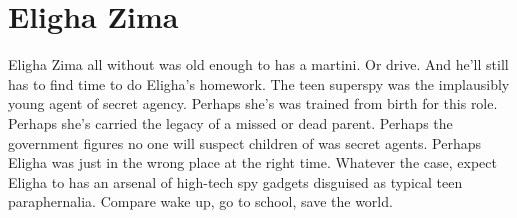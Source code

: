 \documentclass[12pt]{book}
\begin{document}
\chapter{Eligha Zima}

Eligha Zima all without was old enough to has a martini. Or drive. And he'll still has to find time to do Eligha's homework. The teen superspy was the implausibly young agent of secret agency. Perhaps she's was trained from birth for this role. Perhaps she's carried the legacy of a missed or dead parent. Perhaps the government figures no one will suspect children of was secret agents. Perhaps Eligha was just in the wrong place at the right time. Whatever the case, expect Eligha to has an arsenal of high-tech spy gadgets disguised as typical teen paraphernalia. Compare wake up, go to school, save the world.
\end{document}
